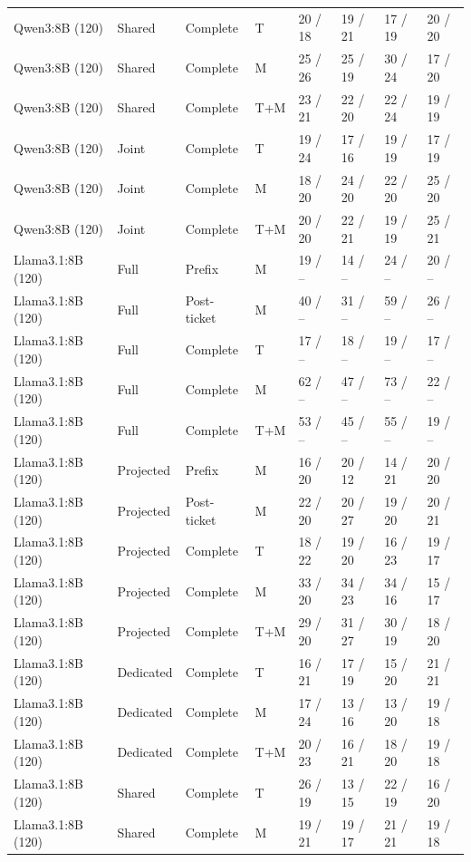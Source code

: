 \begin{longtable}{@{}P{.14\textwidth}P{.14\textwidth}P{.08\textwidth}P{.04\textwidth}P{.125\textwidth}P{.125\textwidth}P{.125\textwidth}P{.125\textwidth}@{}}
Qwen3:8B (120) & Shared & Complete & T & 20 / 18 & 19 / 21 & 17 / 19 & 20 / 20 \\
Qwen3:8B (120) & Shared & Complete & M & 25 / 26 & 25 / 19 & 30 / 24 & 17 / 20 \\
Qwen3:8B (120) & Shared & Complete & T+M & 23 / 21 & 22 / 20 & 22 / 24 & 19 / 19 \\
Qwen3:8B (120) & Joint & Complete & T & 19 / 24 & 17 / 16 & 19 / 19 & 17 / 19 \\
Qwen3:8B (120) & Joint & Complete & M & 18 / 20 & 24 / 20 & 22 / 20 & 25 / 20 \\
Qwen3:8B (120) & Joint & Complete & T+M & 20 / 20 & 22 / 21 & 19 / 19 & 25 / 21 \\
Llama3.1:8B (120) & Full & Prefix & M & 19 / -- & 14 / -- & 24 / -- & 20 / -- \\
Llama3.1:8B (120) & Full & Post-ticket & M & 40 / -- & 31 / -- & 59 / -- & 26 / -- \\
Llama3.1:8B (120) & Full & Complete & T & 17 / -- & 18 / -- & 19 / -- & 17 / -- \\
Llama3.1:8B (120) & Full & Complete & M & 62 / -- & 47 / -- & 73 / -- & 22 / -- \\
Llama3.1:8B (120) & Full & Complete & T+M & 53 / -- & 45 / -- & 55 / -- & 19 / -- \\
Llama3.1:8B (120) & Projected & Prefix & M & 16 / 20 & 20 / 12 & 14 / 21 & 20 / 20 \\
Llama3.1:8B (120) & Projected & Post-ticket & M & 22 / 20 & 20 / 27 & 19 / 20 & 20 / 21 \\
Llama3.1:8B (120) & Projected & Complete & T & 18 / 22 & 19 / 20 & 16 / 23 & 19 / 17 \\
Llama3.1:8B (120) & Projected & Complete & M & 33 / 20 & 34 / 23 & 34 / 16 & 15 / 17 \\
Llama3.1:8B (120) & Projected & Complete & T+M & 29 / 20 & 31 / 27 & 30 / 19 & 18 / 20 \\
Llama3.1:8B (120) & Dedicated & Complete & T & 16 / 21 & 17 / 19 & 15 / 20 & 21 / 21 \\
Llama3.1:8B (120) & Dedicated & Complete & M & 17 / 24 & 13 / 16 & 13 / 20 & 19 / 18 \\
Llama3.1:8B (120) & Dedicated & Complete & T+M & 20 / 23 & 16 / 21 & 18 / 20 & 19 / 18 \\
Llama3.1:8B (120) & Shared & Complete & T & 26 / 19 & 13 / 15 & 22 / 19 & 16 / 20 \\
Llama3.1:8B (120) & Shared & Complete & M & 19 / 21 & 19 / 17 & 21 / 21 & 19 / 18 \\

\end{longtable}
